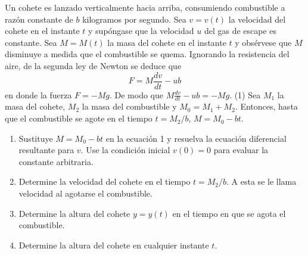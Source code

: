 \item Un cohete es lanzado verticalmente hacia arriba, consumiendo combustible a razón constante de $b$ kilogramos por segundo. Sea $v = v(t)$ la velocidad del cohete en el instante $t$ y supóngase que la velocidad $u$ del gas de escape es constante. Sea $M = M(t)$ la masa del cohete en el instante $t$ y obsérvese que $M$ disminuye a medida que el combustible se quema. Ignorando la resistencia del aire, de la segunda ley de Newton se deduce que
    \[ F = M \frac{dv}{dt} - ub \]
    en donde la fuerza $F = -Mg$. De modo que $M \frac{dv}{dt} - ub = -Mg$. (1)
    Sea $M_1$ la masa del cohete, $M_2$ la masa del combustible y $M_0 = M_1 + M_2$. Entonces, hasta que el combustible se agote en el tiempo $t = M_2/b$, $M = M_0 - bt$.
    \begin{enumerate}
        \item[(a)] Sustituye $M = M_0 - bt$ en la ecuación 1 y resuelva la ecuación diferencial resultante para $v$. Use la condición inicial $v(0) = 0$ para evaluar la constante arbitraria.
        \item[(b)] Determine la velocidad del cohete en el tiempo $t = M_2/b$. A esta se le llama velocidad al agotarse el combustible.
        \item[(c)] Determine la altura del cohete $y = y(t)$ en el tiempo en que se agota el combustible.
        \item[(d)] Determine la altura del cohete en cualquier instante $t$.
    \end{enumerate}
